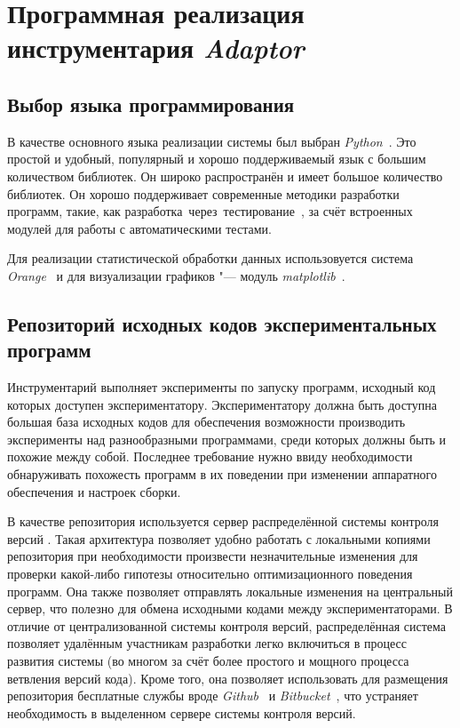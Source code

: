 \section{Программная реализация инструментария \textit{Adaptor}}
\subsection{Выбор языка программирования}
В качестве основного языка реализации системы был выбран \textit{Python}~\cite{python}. Это простой и удобный, популярный и хорошо поддерживаемый язык с большим количеством библиотек. Он широко распространён \cite{langpop} и имеет большое количество библиотек. Он хорошо поддерживает современные методики разработки программ, такие, как \mbox{разработка через тестирование \cite{tdd}}, за счёт встроенных модулей для работы с автоматическими тестами.

Для реализации статистической обработки данных использовуется система \textit{Orange}~\cite{orange} и для визуализации графиков "--- модуль \textit{matplotlib}~\cite{matplotlib}.


\subsection{Репозиторий исходных кодов экспериментальных программ}
Инструментарий выполняет эксперименты по запуску программ, исходный код которых доступен экспериментатору. Экспериментатору должна быть доступна большая база исходных кодов для обеспечения возможности производить эксперименты над разнообразными программами, среди которых должны быть и похожие между собой. Последнее требование нужно ввиду необходимости обнаруживать похожесть программ в их поведении при изменении аппаратного обеспечения и настроек сборки.

В качестве репозитория используется сервер распределённой системы контроля версий \cite{distributed-vcs}. Такая архитектура позволяет удобно работать с локальными копиями репозитория при необходимости произвести незначительные изменения для проверки какой-либо гипотезы относительно оптимизационного поведения программ. Она также позволяет отправлять локальные изменения на центральный сервер, что полезно для обмена исходными кодами между экспериментаторами. В отличие от централизованной системы контроля версий, распределённая система позволяет удалённым участникам разработки легко включиться в процесс развития системы (во многом за счёт более простого и мощного процесса ветвления версий кода). Кроме того, она позволяет использовать для размещения репозитория бесплатные службы вроде \textit{Github}~\cite{github} и \textit{Bitbucket}~\cite{bitbucket}, что устраняет необходимость в выделенном сервере системы контроля версий.

